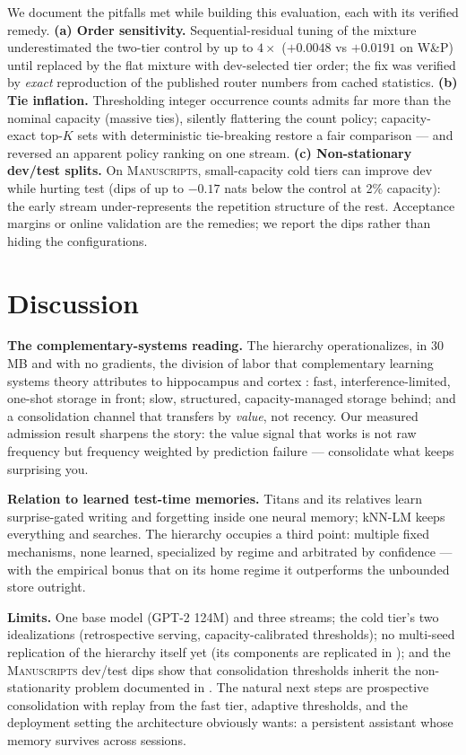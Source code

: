 \documentclass[11pt]{article}
\begin{document}
We document the pitfalls met while building this evaluation, each with its verified remedy.
\textbf{(a) Order sensitivity.} Sequential-residual tuning of the mixture underestimated the two-tier control by up to $4\times$ ($+0.0048$ vs $+0.0191$ on \textsc{W\&P}) until replaced by the flat mixture with dev-selected tier order; the fix was verified by \emph{exact} reproduction of the published router numbers from cached statistics.
\textbf{(b) Tie inflation.} Thresholding integer occurrence counts admits far more than the nominal capacity (massive ties), silently flattering the count policy; capacity-exact top-$K$ sets with deterministic tie-breaking restore a fair comparison --- and reversed an apparent policy ranking on one stream.
\textbf{(c) Non-stationary dev/test splits.} On \textsc{Manuscripts}, small-capacity cold tiers can improve dev while hurting test (dips of up to $-0.17$ nats below the control at 2\% capacity): the early stream under-represents the repetition structure of the rest. Acceptance margins or online validation are the remedies; we report the dips rather than hiding the configurations.

\section{Discussion}

\textbf{The complementary-systems reading.} The hierarchy operationalizes, in 30\,MB and with no gradients, the division of labor that complementary learning systems theory attributes to hippocampus and cortex \cite{mcclelland,kumaran}: fast, interference-limited, one-shot storage in front; slow, structured, capacity-managed storage behind; and a consolidation channel that transfers by \emph{value}, not recency. Our measured admission result sharpens the story: the value signal that works is not raw frequency but frequency weighted by prediction failure --- consolidate what keeps surprising you.

\textbf{Relation to learned test-time memories.} Titans and its relatives \cite{titans,ttr} learn surprise-gated writing and forgetting inside one neural memory; kNN-LM \cite{khandelwal2020} keeps everything and searches. The hierarchy occupies a third point: multiple fixed mechanisms, none learned, specialized by regime and arbitrated by confidence --- with the empirical bonus that on its home regime it outperforms the unbounded store outright.

\textbf{Limits.} One base model (GPT-2 124M) and three streams; the cold tier's two idealizations (retrospective serving, capacity-calibrated thresholds); no multi-seed replication of the hierarchy itself yet (its components are replicated in \cite{sillage,router}); and the \textsc{Manuscripts} dev/test dips show that consolidation thresholds inherit the non-stationarity problem documented in \cite{router}. The natural next steps are prospective consolidation with replay from the fast tier, adaptive thresholds, and the deployment setting the architecture obviously wants: a persistent assistant whose memory survives across sessions.
\end{document}
